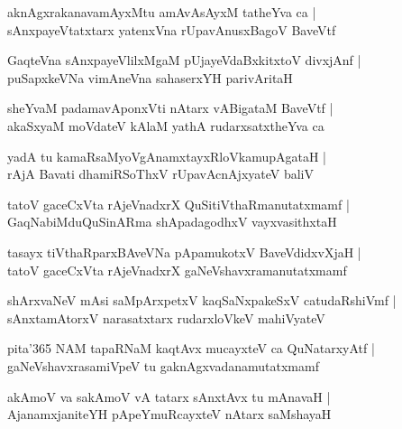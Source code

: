 \documentclass[twoside,12pt,openright]{book}
\newcounter{shloka}[chapter]
\begin{document}
\begin{shloka}
aknAgxrakanavamAyxMtu amAvAsAyxM tatheYva ca |\\
sAnxpayeVtatxtarx yatenxVna rUpavAnusxBagoV BaveVtf
\end{shloka}

\begin{shloka}
GaqteVna sAnxpayeVlilxMgaM pUjayeVdaBxkitxtoV divxjAnf |\\
puSapxkeVNa vimAneVna sahaserxYH parivAritaH 
\end{shloka}

\begin{shloka}
sheYvaM padamavAponxVti nAtarx vABigataM BaveVtf |\\
akaSxyaM moVdateV kAlaM yathA rudarxsatxtheYva ca 
\end{shloka}

\begin{shloka}
yadA tu kamaRsaMyoVgAnamxtayxRloVkamupAgataH |\\
rAjA Bavati dhamiRSoThxV rUpavAcnAjxyateV baliV 
\end{shloka}

\begin{shloka}
tatoV gaceCxVta rAjeVnadxrX QuSitiVthaRmanutatxmamf |\\
GaqNabiMduQuSinARma shApadagodhxV vayxvasithxtaH 
\end{shloka}

\begin{shloka}
tasayx tiVthaRparxBAveVNa pApamukotxV BaveVdidxvXjaH |\\
tatoV gaceCxVta rAjeVnadxrX gaNeVshavxramanutatxmamf
\end{shloka}

\begin{shloka}
shArxvaNeV mAsi saMpArxpetxV kaqSaNxpakeSxV catudaRshiVmf |\\
sAnxtamAtorxV narasatxtarx rudarxloVkeV mahiVyateV 
\end{shloka}

\begin{shloka}
pita\char'365 NAM tapaRNaM kaqtAvx mucayxteV ca QuNatarxyAtf |\\
gaNeVshavxrasamiVpeV tu gaknAgxvadanamutatxmamf 
\end{shloka}

\begin{shloka}
akAmoV va sakAmoV vA tatarx sAnxtAvx tu mAnavaH |\\
AjanamxjaniteYH  pApeYmuRcayxteV nAtarx saMshayaH 
\end{shloka}
\end{document}
